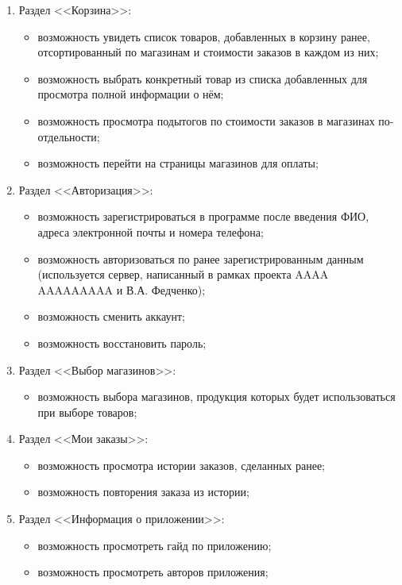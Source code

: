 \documentclass[a4paper,12pt]{article}
\begin{document}
\begin{enumerate}
    \item Раздел <<Корзина>>:
    \begin{itemize}
      \item возможность увидеть список товаров, добавленных в корзину ранее, отсортированный по магазинам и стоимости заказов в каждом из них;
      \item возможность выбрать конкретный товар из списка добавленных для просмотра полной информации о нём;
      \item возможность просмотра подытогов по стоимости заказов в магазинах по-отдельности;
      \item возможность перейти на страницы магазинов для оплаты;
    \end{itemize}
    \item Раздел <<Авторизация>>:
    \begin{itemize}
      \item возможность зарегистрироваться в программе после введения ФИО, адреса электронной почты и номера телефона;
      \item возможность авторизоваться по ранее зарегистрированным данным (используется сервер, написанный в рамках проекта AAAA AAAAAAAAA и В.А. Федченко);
      \item возможность сменить аккаунт;
      \item возможность восстановить пароль;
    \end{itemize}
    \item Раздел <<Выбор магазинов>>:
    \begin{itemize}
      \item возможность выбора магазинов, продукция которых будет использоваться при выборе товаров;
    \end{itemize}
    \item Раздел <<Мои заказы>>:
    \begin{itemize}
      \item возможность просмотра истории заказов, сделанных ранее;
      \item возможность повторения заказа из истории;
    \end{itemize}
    \item Раздел <<Информация о приложении>>:
    \begin{itemize}
      \item возможность просмотреть гайд по приложению;
      \item возможность просмотреть авторов приложения;
    \end{itemize}
  \end{enumerate}
\end{document}
